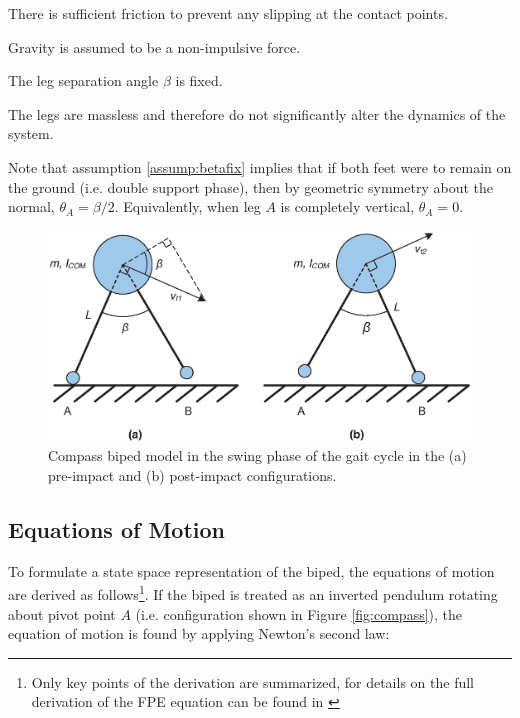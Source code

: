 \begin{assumption}
	There is sufficient friction to prevent any slipping at the contact points. 
\end{assumption}

\begin{assumption}
	Gravity is assumed to be a non-impulsive force. 
\end{assumption}

\begin{assumption} \label{assump:betafix}
	The leg separation angle $\beta$ is fixed.
\end{assumption}

\begin{assumption} \label{assump:massless}
	The legs are massless and therefore do not significantly alter the dynamics of the system. 
\end{assumption}

\hrulefill

Note that assumption \ref{assump:betafix} implies that if both feet were to remain on the ground (i.e. double support phase), then by geometric symmetry about the normal, $\theta _A = \beta/2$. Equivalently, when leg $A$ is completely vertical, $\theta _A = 0$.

\begin{figure}[!h]
	\centering
    \includegraphics[scale=0.6]{fig/fpe/fig2.eps}
  	\caption{Compass biped model in the swing phase of the gait cycle in the (a) pre-impact and (b) post-impact configurations.}
	\label{fig:prepost}
\end{figure}

\subsection{Equations of Motion}

To formulate a state space representation of the biped, the equations of motion are derived as follows\footnote{Only key points of the derivation are summarized, for details on the full derivation of the FPE equation can be found in \cite{Wight:2008vt,Millard:2011vk}}. If the biped is treated as an inverted pendulum rotating about pivot point $A$ (i.e. configuration shown in Figure  \ref{fig:compass}), the equation of motion is found by applying Newton's second law:

